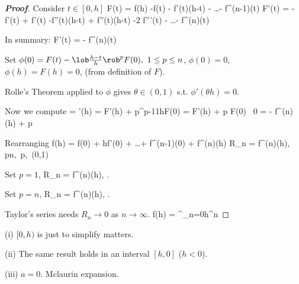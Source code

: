 \begin{proof}[{\bf Proof}]
Consider $t\in [0,h]$
\be
F(t) = f(h) -f(t) - f'(t)(h-t) - \dots -  f^{(n-1)}(t)
\ee
\be
F'(t) = -f'(t) + f'(t) -f''(t)(h-t) + f''(t)(h-t) -2 f'''(t) - \dots -  f^{(n)}(t)
\ee

In summary:
\be
F'(t) = -  f^{(n)}(t)
\ee

Set $\phi(0)=F(t) - \lob\frac{h-t}{h}\rob^p F(0), \ 1\leq p\leq n$, $\phi(0)=0$, $ \phi(h) = F(h) = 0$, (from definition of $F$).

Rolle's Theorem applied to $\phi$ gives $\theta\in(0,1)$ s.t. $\phi'(\theta h)=0$.

Now we compute
 = \phi'(\theta h) = F'(\theta h) + p\lob{}\rob^{p-1}\lob\frac 1h\rob F(0) = F'(\theta h) + p F(0)
\ee
\be
\ra \ 0 = -  f^{(n)}(\theta h) +  p 
\ee

Rearranging
\be
f(h) = f(0) + hf'(0) + \dots +  f^{(n-1)}(0) + f^{(n)}(\theta h)
\ee
\be
R_n =  f^{(n)}(\theta h), \leq p\leq n,\ p\in \Z,\ \theta\in(0,1)
\ee

Set $p=1$,
\be
R_n =  f^{(n)}(\theta h), \quad {}.
\ee

Set $p=n$,
\be
R_n =  f^{(n)}(\theta h), \quad {}.
\ee

Taylor's series needs $R_n\to 0$ as $n\to \infty$.
\be
f(h) = \sum^\infty_{n=0}h^n
\ee
\end{proof}

\begin{remark}
\ben
\item [(i)] $[0,h)$ is just to simplify matters.
\item [(ii)] The same result holds in an interval $[h,0]$ ($h<0$).
\item [(iii)] $a=0$. Mclaurin expansion.
\een
\end{remark}

